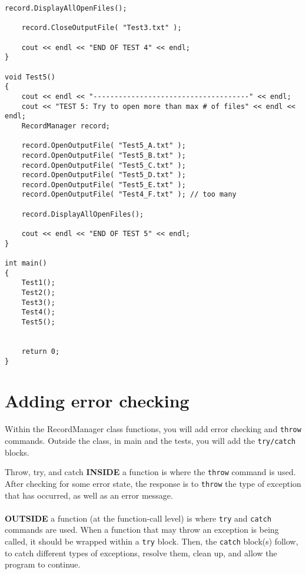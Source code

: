 \documentclass[a4paper,12pt]{book}
\begin{document}
\begin{lstlisting}[style=code]
    record.DisplayAllOpenFiles();
    
    record.CloseOutputFile( "Test3.txt" );

    cout << endl << "END OF TEST 4" << endl;
}

void Test5()
{
    cout << endl << "-------------------------------------" << endl;
    cout << "TEST 5: Try to open more than max # of files" << endl << endl;
    RecordManager record;

    record.OpenOutputFile( "Test5_A.txt" );
    record.OpenOutputFile( "Test5_B.txt" );
    record.OpenOutputFile( "Test5_C.txt" );
    record.OpenOutputFile( "Test5_D.txt" );
    record.OpenOutputFile( "Test5_E.txt" );
    record.OpenOutputFile( "Test4_F.txt" ); // too many

    record.DisplayAllOpenFiles();

    cout << endl << "END OF TEST 5" << endl;
}

int main()
{
    Test1();
    Test2();
    Test3();
    Test4();
    Test5();
    
    
    return 0;
}
\end{lstlisting}

        \newpage
        \section*{Adding error checking}

            Within the RecordManager class functions, you will add error
            checking and \texttt{throw} commands. Outside the class, in
            main and the tests, you will add the \texttt{try/catch} blocks.
            
            \begin{intro}{Throw, try, and catch}
                \textbf{INSIDE} a function is where the
                \texttt{throw} command is used. After checking
                for some error state, the response is to
                \texttt{throw} the type of exception that has
                occurred, as well as an error message. 
                ~\\~\\
                \textbf{OUTSIDE} a function (at the function-call level)
                is where \texttt{try} and \texttt{catch} commands
                are used. When a function that may throw an exception is
                being called, it should be wrapped within a \texttt{try}
                block. Then, the \texttt{catch} block(s) follow, to catch
                different types of exceptions, resolve them, clean up,
                and allow the program to continue.
            \end{intro}
            
\end{document}
